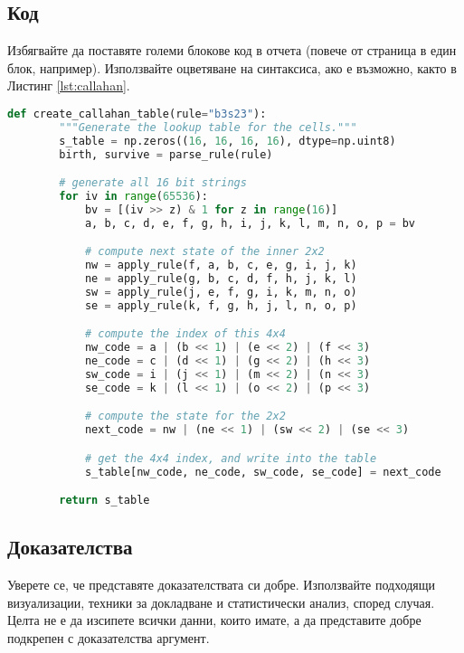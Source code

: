\subsection{Код}

Избягвайте да поставяте големи блокове код в отчета (повече от страница в един блок, например). Използвайте оцветяване на синтаксиса, ако е възможно, както в Листинг \cref{lst:callahan}.

\begin{lstlisting}[language=python, float, caption={The algorithm for packing the $3\times 3$ outer-totalistic binary CA successor rule into a 
    $16\times 16\times 16\times 16$ 4 bit lookup table, running an equivalent, notionally 16-state $2\times 2$ CA.}, label=lst:callahan]
    def create_callahan_table(rule="b3s23"):
        """Generate the lookup table for the cells."""        
        s_table = np.zeros((16, 16, 16, 16), dtype=np.uint8)
        birth, survive = parse_rule(rule)

        # generate all 16 bit strings
        for iv in range(65536):
            bv = [(iv >> z) & 1 for z in range(16)]
            a, b, c, d, e, f, g, h, i, j, k, l, m, n, o, p = bv

            # compute next state of the inner 2x2
            nw = apply_rule(f, a, b, c, e, g, i, j, k)
            ne = apply_rule(g, b, c, d, f, h, j, k, l)
            sw = apply_rule(j, e, f, g, i, k, m, n, o)
            se = apply_rule(k, f, g, h, j, l, n, o, p)

            # compute the index of this 4x4
            nw_code = a | (b << 1) | (e << 2) | (f << 3)
            ne_code = c | (d << 1) | (g << 2) | (h << 3)
            sw_code = i | (j << 1) | (m << 2) | (n << 3)
            se_code = k | (l << 1) | (o << 2) | (p << 3)

            # compute the state for the 2x2
            next_code = nw | (ne << 1) | (sw << 2) | (se << 3)

            # get the 4x4 index, and write into the table
            s_table[nw_code, ne_code, sw_code, se_code] = next_code

        return s_table

\end{lstlisting}


\subsection{Доказателства}
Уверете се, че представяте доказателствата си добре. Използвайте подходящи визуализации, 
техники за докладване и статистически анализ, според случая. Целта не е
да изсипете всички данни, които имате, а да представите добре подкрепен с доказателства аргумент.

